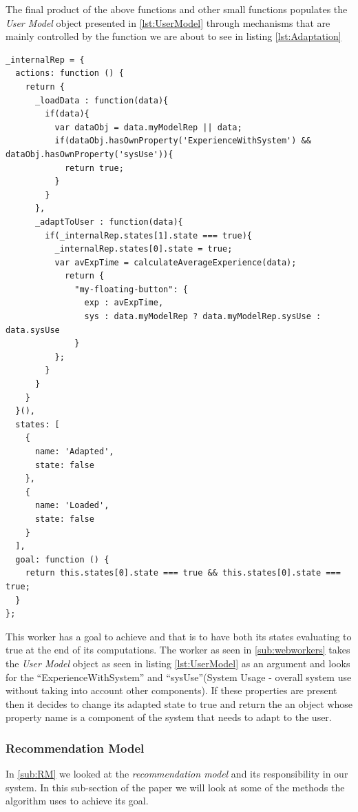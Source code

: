 The final product of the above functions and other small functions populates the \emph{User Model} object presented in \ref{lst:UserModel} through mechanisms that are mainly controlled by the function we are about to see in listing \ref{lst:Adaptation}
\begin{lstlisting}[caption={Agent Worker thread - internal representation of User}, label={lst:Adaptation}]
    _internalRep = {
  actions: function () {
    return {
      _loadData : function(data){
        if(data){
          var dataObj = data.myModelRep || data;
          if(dataObj.hasOwnProperty('ExperienceWithSystem') && dataObj.hasOwnProperty('sysUse')){
            return true;
          }
        }
      },
      _adaptToUser : function(data){
        if(_internalRep.states[1].state === true){
          _internalRep.states[0].state = true;
          var avExpTime = calculateAverageExperience(data);
            return {
              "my-floating-button": {
                exp : avExpTime,
                sys : data.myModelRep ? data.myModelRep.sysUse : data.sysUse
              }
          };
        }
      }
    }
  }(),
  states: [
    {
      name: 'Adapted',
      state: false
    },
    {
      name: 'Loaded',
      state: false
    }
  ],
  goal: function () {
    return this.states[0].state === true && this.states[0].state === true;
  }
};
\end{lstlisting}
This worker has a goal to achieve and that is to have both its states evaluating to true at the end of its computations. The worker as seen in \ref{sub:webworkers} takes the \emph{User Model} object as seen in listing \ref{lst:UserModel} as an argument and looks for the ``ExperienceWithSystem'' and ``sysUse''(System Usage - overall system use without taking into account other components). If these properties are present then it decides to change its adapted state to true and return the an object whose property name is a component of the system that needs to adapt to the user.

\subsubsection{Recommendation Model}
In \ref{sub:RM} we looked at the \emph{recommendation model} and its responsibility in our system. In this sub-section of the paper we will look at some of the methods the algorithm uses to achieve its goal.

